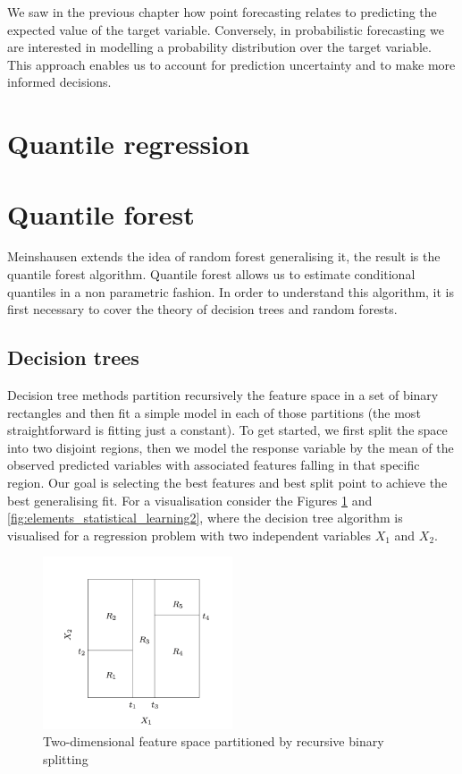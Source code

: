 We saw in the previous chapter how point forecasting relates to predicting the expected value of the target variable.
Conversely, in probabilistic forecasting we are interested in modelling a probability distribution over the target variable.
This approach enables us to account for prediction uncertainty and to make more informed decisions.
\section{Quantile regression}


\section{Quantile forest}
Meinshausen \cite{meinshausen2006quantile} extends the idea of random forest \cite{breiman2001random} generalising it, the result is the quantile forest algorithm. Quantile forest allows us to estimate conditional quantiles in a non parametric fashion.
In order to understand this algorithm, it is first necessary to cover the theory of decision trees and random forests.
\subsection{Decision trees}
Decision tree methods partition recursively the feature space in a set of binary rectangles and then fit a simple model in each of those partitions (the most straightforward is fitting just a constant).
To get started, we first split the space into two disjoint regions, then we model the response variable by the mean of the observed predicted variables with associated features falling in that specific region. Our goal is selecting the best features and best split point to achieve the best generalising fit.
For a visualisation consider the Figures \ref{fig:elements_statistical_learning1} and \ref{fig:elements_statistical_learning2}, where the decision tree algorithm is visualised for a regression problem with two independent variables $X_1$ and $X_2$.
\begin{figure}
    \includegraphics[width=0.5\textwidth]{images/elsii1.png}
    \caption{Two-dimensional feature space partitioned by recursive binary splitting \cite{hastie2009elements}}
    \label{fig:elements_statistical_learning1}
  \end{figure}

